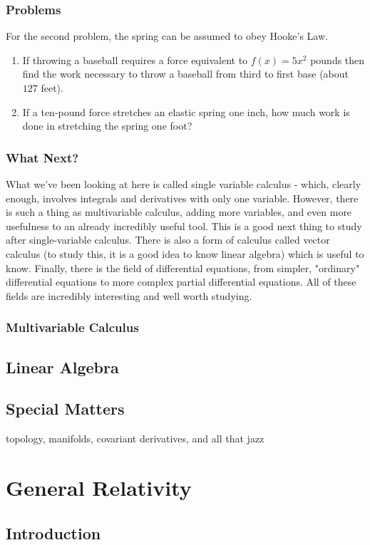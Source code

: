 \documentclass{memoir}
\begin{document}
\section{Problems}
For the second problem, the spring can be assumed to obey Hooke's Law.

\begin{enumerate}
    \item If throwing a baseball requires a force equivalent to $f(x) = 5x^2$ pounds then find the work necessary to throw a baseball from third to first base (about $127$ feet).
    \item If a ten-pound force stretches an elastic spring one inch, how much work is done in stretching the spring one foot?
\end{enumerate}

\section{What Next?}

What we've been looking at here is called single variable calculus - which, clearly enough, involves integrals and derivatives with only one variable. 
However, there is such a thing as multivariable calculus, adding more variables, and even more usefulness to an already incredibly useful tool. 
This is a good next thing to study after single-variable calculus. 
There is also a form of calculus called vector calculus (to study this, it is a good idea to know
linear algebra) which is useful to know. 
Finally, there is the field of differential equations, from simpler, "ordinary" differential equations to more complex partial differential equations. 
All of these fields are incredibly interesting and well worth studying.
\section{Multivariable Calculus}
\chapter{Linear Algebra}
\chapter{Special Matters}
topology, manifolds, covariant derivatives, and all that jazz
\part{General Relativity}
\chapter{Introduction}
\end{document}
